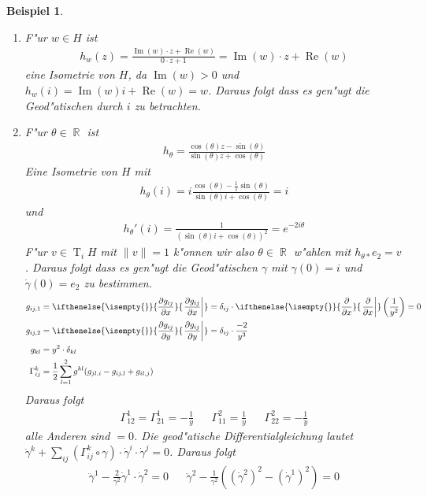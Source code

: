 \documentclass[paper=A4, twoside, chapterprefix=true, bibliography=totoc, headsepline]{scrbook}
\let\temp\phi
\let\phi\varphi
\let\varphi\temp
\let\temp\theta
\let\theta\vartheta
\let\vartheta\temp
\let\temp\epsilon
\let\epsilon\varepsilon
\let\varepsilon\temp
\let\temp\rho
\let\rho\varrho
\let\varrho\temp
\DeclareMathOperator{\R}{\mathbb{R}}
\DeclareMathOperator{\T}{T} %
\renewcommand{\Re}{\ensuremath{\operatorname{Re}}}
\renewcommand{\Im}{\ensuremath{\operatorname{Im}}}
\newcommand{\pdifffrac}[3][]{\ifthenelse{\isempty{#1}}{\frac{\partial #2}{\partial #3}}{\left. \frac{\partial #2}{\partial #3} \right|_{#1}}}
\theoremstyle{plain}
\theoremstyle{nonumberplain}
\newtheorem{bsp}{Beispiel}
\theoremstyle{empty}
\theoremstyle{break}
\newcommand{\quot}[1]{\textrm{\glqq}{#1}\textrm{\grqq}}
\begin{document}
\begin{bsp}\begin{enumerate}[label=(\arabic*),leftmargin=*]
\item
	F"ur $w \in H$ ist
	\begin{align*}
		h_w(z) = \frac{\Im(w) \cdot z + \Re(w)}{0 \cdot z + 1} = \Im(w) \cdot z + \Re(w)
	\end{align*}
	eine Isometrie von $H$, da $\Im(w) > 0$ und $h_w(i) = \Im(w) i + \Re(w) = w$. Daraus folgt dass es gen"ugt die Geod"atischen durch $i$ zu betrachten.
\item
	F"ur $\vartheta \in \R$ ist
	\begin{align*}
		h_\vartheta = \frac{\cos(\vartheta)z - \sin(\vartheta)}{\sin(\vartheta)z + \cos(\vartheta)}
	\end{align*}
	Eine Isometrie von $H$ mit
	\begin{align*}
		h_\vartheta(i) = i \frac{\cos(\vartheta) - \frac{1}{i} \sin(\vartheta)}{\sin(\vartheta) i + \cos(\vartheta)} = i
	\end{align*}
	und
	\begin{align*}
		h_{\vartheta}'(i) = \frac{1}{(\sin(\vartheta) i + \cos(\vartheta))^2} = e^{-2i\vartheta}
	\end{align*}
	F"ur $v \in \T_iH$ mit $\|v\| = 1$ k"onnen wir also $\vartheta \in \R$ w"ahlen mit $h_{\vartheta *}e_2 = v$.
	Daraus folgt dass es gen"ugt die Geod"atischen $\gamma$ mit $\gamma(0) = i$ und $\dot\gamma(0) = e_2$ zu bestimmen.
	\begin{align*}
		g_{ij,1} &= \pdifffrac{g_{ij}}{x} = \delta_{ij} \cdot \pdifffrac{}{x} \left( \frac{1}{y^2} \right) = 0 \\
		g_{ij,2} &= \pdifffrac{g_{ij}}{y} = \delta_{ij} \cdot \frac{-2}{y^3} \\
		g_{kl} &= y^2 \cdot \delta_{kl} \\
		\Gamma_{ij}^k &= \frac{1}{2} \sum_{l=1}^2 g^{kl} (g_{jl,i} - g_{ij,l} + g_{il,j})
	\end{align*}
	Daraus folgt
	\begin{align*}
		\Gamma_{12}^1 = \Gamma_{21}^1 = - \frac{1}{y} && \Gamma_{11}^2 = \frac{1}{y} && \Gamma_{22}^2 = - \frac{1}{y}
	\end{align*}
	alle Anderen sind \quot{$=0$}.
	Die geod"atische Differentialgleichung lautet $\ddot\gamma^k + \sum_{ij} (\Gamma_{ij}^k \circ \gamma) \cdot \dot\gamma^{i} \cdot \dot\gamma^j = 0$. Daraus folgt
	\begin{align*}
		\ddot\gamma^1 - \frac{2}{\gamma^2} \dot\gamma^1 \cdot \dot\gamma^2 = 0 && \ddot\gamma^2 - \frac{1}{\gamma^2} ((\dot\gamma^2)^2 - (\dot\gamma^1)^2) = 0

\end{align*}
\end{enumerate}
\end{bsp}
\end{document}
